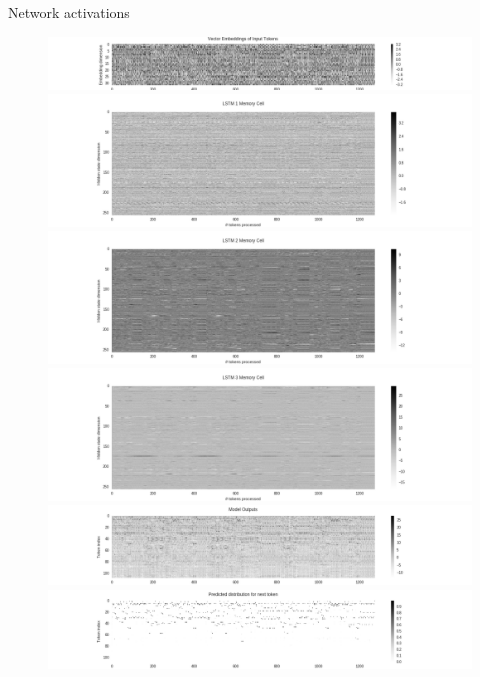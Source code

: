 \documentclass[dissertation.tex]{subfiles}
\begin{document}
Network activations

\begin{figure}[htpb]
    \centering
    \includegraphics[width=1.0\linewidth]{Figures/model-analysis-tokens-0.png}
    \includegraphics[width=1.0\linewidth]{Figures/model-analysis-tokens-1.png}
    \includegraphics[width=1.0\linewidth]{Figures/model-analysis-tokens-2.png}
    \includegraphics[width=1.0\linewidth]{Figures/model-analysis-tokens-3.png}
    \includegraphics[width=1.0\linewidth]{Figures/model-analysis-tokens-4.png}
    \includegraphics[width=1.0\linewidth]{Figures/model-analysis-tokens-5.png}
    \caption{}
    \label{fig:}
\end{figure}
\end{document}
